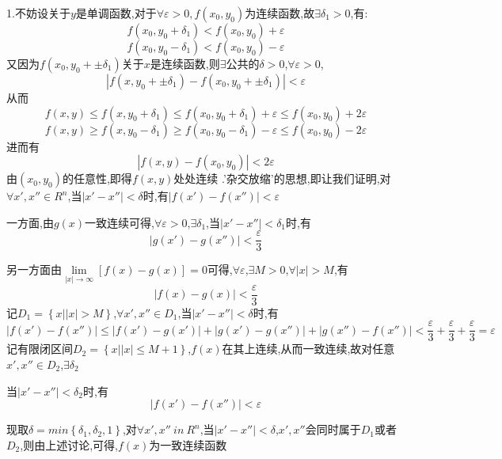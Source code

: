 \documentclass{ctexart}
\begin{document}
    \begin{tcolorbox}[title = {解析},colbacktitle=green!35!black,colback=green!1,arc = 2mm, outer arc = 2mm,fonttitle = \itshape, fontupper = \itshape, fontlower = \itshape]
     1.不妨设关于$y$是单调函数,对于$\forall \varepsilon >0,f(x_{0},y_{0})$为连续函数,故$\exists \delta_{1}>0$,有:
     $$f(x_{0},y_{0}+\delta_{1}) <f(x_{0},y_{0})+\varepsilon $$
      $$f(x_{0},y_{0}-\delta_{1}) <f(x_{0},y_{0})-\varepsilon $$
      又因为$\displaystyle{f(x_{0},y_{0}+\pm \delta_{1})}$关于$x$是连续函数,则$\exists $公共的$\delta >0$,$\forall \varepsilon >0$,$$\left|f(x,y_{0}+\pm \delta_{1})-f(x_{0},y_{0}+\pm \delta_{1})\right| < \varepsilon$$
      从而
      $$f(x,y)\le f(x,y_{0}+\delta_{1}) \le f(x_{0},y_{0}+\delta_{1})+\varepsilon \le f(x_{0},y_{0})+2\varepsilon$$
       $$f(x,y)\ge f(x,y_{0}-\delta_{1}) \ge f(x_{0},y_{0}-\delta_{1})-\varepsilon \le f(x_{0},y_{0})-2\varepsilon$$
       进而有$$\left|f(x,y)-f(x_{0},y_{0}) \right| < 2\varepsilon $$
       由$(x_{0},y_{0})$的任意性,即得$f(x,y)$处处连续
      .'杂交放缩'的思想,即让我们证明,对$\forall x',x'' \in R^{n}$,当$\left|x'-x'' \right|<\delta $时,有$\left|f(x')-f(x'') \right| < \varepsilon $
       
       一方面,由$g(x)$一致连续可得,$\forall \varepsilon >0$,$\exists \delta_{1}$,当$\left|x'-x'' \right| <\delta_{1} $时,有$$\left|g(x')-g(x'') \right| < \frac{\varepsilon}{3} $$
       
       另一方面由$\lim\limits_{\left|x \right|  \to \infty}\left[f(x)-g(x) \right] =0$可得,$\forall \varepsilon$,$\exists M>0$,$\forall \left| x\right| >M$,有$$\left|f(x)-g(x) \right|<\frac{\varepsilon}{3}$$
      记$D_{1}=\left\lbrace x | \left| x \right| > M  \right\rbrace $,$\forall x',x'' \in D_{1}$,当$\left| x'-x''\right| <\delta $时,有$$\left|f(x')-f(x'') \right| \le \left|f(x')-g(x') \right| +\left|g(x')-g(x'') \right| +\left|g(x'')-f(x'') \right| < \frac{\varepsilon}{3}+\frac{\varepsilon}{3}+\frac{\varepsilon}{3}=\varepsilon  $$
      记有限闭区间$D_{2}=\left\lbrace x | \left| x \right| \le M+1  \right\rbrace $,$f(x)$在其上连续,从而一致连续,故对任意$x',x'' \in D_{2}$,$\exists \delta_{2} $
      
      当$\left|x'-x'' \right|< \delta_{2} $时,有$$\left|f(x')-f(x'') \right|< \varepsilon $$
     
       现取$\delta =min\left\lbrace \delta_{1},\delta_{2},1  \right\rbrace $,对$\forall x',x'' \ in \ R^{n}$,当$\left|x'-x'' \right| <\delta $,$x',x''$会同时属于$D_{1}$或者$D_{2}$,则由上述讨论,可得,$f(x)$为一致连续函数
     
\end{tcolorbox}
      
\end{document}
